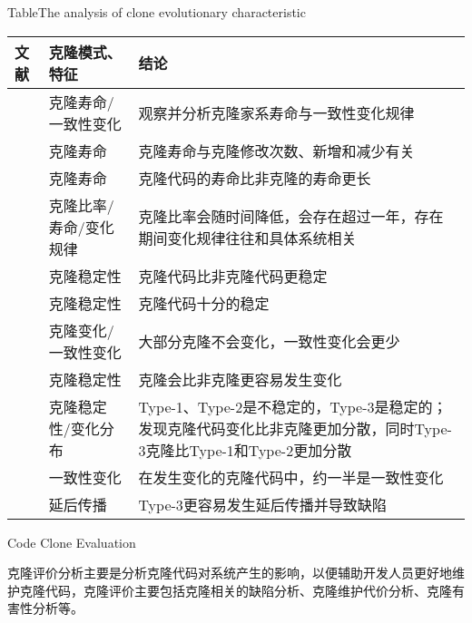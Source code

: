 \begin{table}[h]
\centering
{}
{Table$\!$}{The analysis of clone evolutionary characteristic}
\vspace{0.5em}
\wuhao
\begin{tabularx}{0.9\textwidth}{llX}
\toprule[1.5pt]
文献&克隆模式、特征&结论\\
\midrule[1pt]
\cite{kim2005empirical}&	克隆寿命/一致性变化	&观察并分析克隆家系寿命与一致性变化规律\\
\cite{cai2011empirical}&	克隆寿命&	克隆寿命与克隆修改次数、新增和减少有关\\
\cite{krinke2011cloned}&	克隆寿命&	克隆代码的寿命比非克隆的寿命更长\\
\cite{bazrafshan2012evolution}\cite{gode2009evolution}&	克隆比率/寿命/变化规律	&克隆比率会随时间降低，会存在超过一年，存在期间变化规律往往和具体系统相关\\
\hline
\cite{krinke2008cloned}&克隆稳定性&	克隆代码比非克隆代码更稳定\\
\cite{gode2011clone}\cite{harder2013cloned}&	克隆稳定性&	克隆代码十分的稳定\\
\cite{gode2011frequency}&	克隆变化/一致性变化&	大部分克隆不会变化，一致性变化会更少\\
\cite{rahman2014change}&	克隆稳定性&	克隆会比非克隆更容易发生变化\\
\cite{mondal2012comparative}\cite{mondal2012dispersion}&	克隆稳定性/变化分布&	Type-1、Type-2是不稳定的，Type-3是稳定的；发现克隆代码变化比非克隆更加分散，同时Type-3克隆比Type-1和Type-2更加分散\\
\hline
\cite{krinke2007study}&	一致性变化&	在发生变化的克隆代码中，约一半是一致性变化\\
\cite{barbour2011late}\cite{mondal2016comparative}&	延后传播&	Type-3更容易发生延后传播并导致缺陷\\
\bottomrule[1.5pt]
\end{tabularx}
\end{table}

{Code Clone Evaluation}

克隆评价分析主要是分析克隆代码对系统产生的影响，以便辅助开发人员更好地维护克隆代码，克隆评价主要包括克隆相关的缺陷分析、克隆维护代价分析、克隆有害性分析等。

